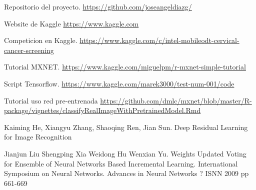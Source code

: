 % 

\begin{thebibliography}{99}

	\emph{} Repositorio del proyecto. \url{https://github.com/joseangeldiazg/}

	\emph{} Website de Kaggle \url{https://www.kaggle.com}	

	\emph{} Competicion en Kaggle. \url{https://www.kaggle.com/c/intel-mobileodt-cervical-cancer-screening}
	
	\emph{} Tutorial MXNET. \url{https://www.kaggle.com/miguelpm/r-mxnet-simple-tutorial}
	
	\emph{} Script Tensorflow. \url{https://www.kaggle.com/marek3000/test-num-001/code}
	
	\emph{} Tutorial uso red pre-entrenada \url{https://github.com/dmlc/mxnet/blob/master/R-package/vignettes/classifyRealImageWithPretrainedModel.Rmd}
	
	\emph{}Kaiming He, Xiangyu Zhang, Shaoqing Ren, Jian Sun. Deep Residual Learning for Image Recognition
	
	\emph{} Jianjun Liu Shengping Xia Weidong Hu Wenxian Yu. Weights Updated Voting for Ensemble of Neural Networks Based Incremental Learning. International Symposium on Neural Networks. Advances in Neural Networks ? ISNN 2009 pp 661-669
	
\end{thebibliography}
